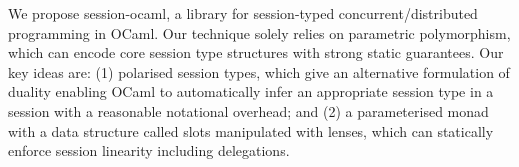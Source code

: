 We propose session-ocaml, a library for session-typed concurrent/distributed programming in OCaml. Our technique solely relies on parametric polymorphism, which can encode core session type structures with strong static guarantees. Our key ideas are: (1) polarised session types, which give an alternative formulation of duality enabling OCaml to automatically infer an appropriate session type in a session with a reasonable notational overhead; and (2) a parameterised monad with a data structure called slots manipulated with lenses, which can statically enforce session linearity including delegations.